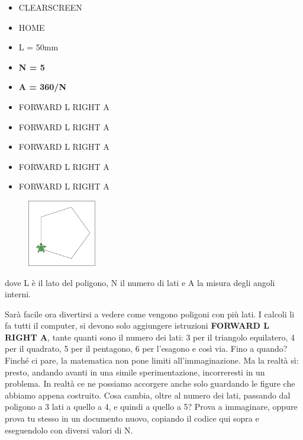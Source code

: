 \vskip 1cm

\begin{scriptsize}
\begin{minipage}{0.40\textwidth}
\begin{itemize}[itemsep=-3pt,parsep=2pt]
\item[] CLEARSCREEN                                 
\item[] HOME
\item[] L = 50mm
\item[] \textbf{N = 5}
\item[] \textbf{A = 360/N}
\item[] FORWARD L RIGHT A
\item[] FORWARD L RIGHT A
\item[] FORWARD L RIGHT A
\item[] FORWARD L RIGHT A
\item[] FORWARD L RIGHT A                           
\end{itemize}
\end{minipage}
\end{scriptsize}
\begin{minipage}{0.4\textwidth}
\begin{figure}[H]
   \includegraphics[width=3.0cm,trim=4 4 8 4,clip]{./images/ripetere/ripetere-3.png}
   \label{rip-2-b}
\end{figure}
\end{minipage} \hfill

dove L è il lato del poligono, N il numero di lati e A la misura degli angoli interni.

Sarà facile ora divertirsi a vedere come vengono poligoni con più lati. I calcoli li fa tutti il computer, si devono solo aggiungere istruzioni \textbf{FORWARD L RIGHT A}, tante quanti sono il numero dei lati: 3 per il triangolo equilatero, 4 per il quadrato, 5 per il pentagono, 6 per l'esagono e così via. Fino a quando? Finché ci pare, la matematica non pone limiti all'immaginazione. Ma la realtà sì: presto, andando avanti in una simile sperimentazione, incorreresti in un problema. In realtà ce ne possiamo accorgere anche solo guardando le  figure che abbiamo appena costruito. Cosa cambia, oltre al numero dei lati, passando dal poligono a 3 lati a quello a 4, e quindi a quello a 5? Prova a immaginare, oppure prova tu stesso in un documento nuovo, copiando il codice qui sopra e eseguendolo con diversi valori di N.

